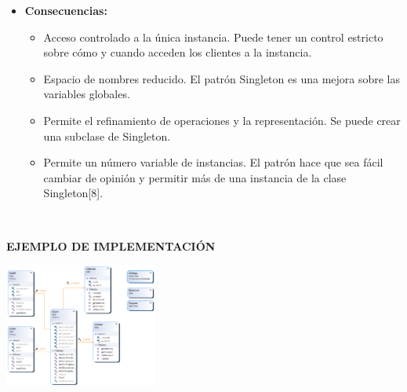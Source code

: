 \documentclass[twoside,twocolumn]{article}
\begin{document}
\begin{itemize}
		\item \textbf{Consecuencias:} 
        \begin{itemize}
            \item Acceso controlado a la única instancia. Puede tener un control estricto sobre cómo y cuando acceden los clientes a la instancia.   	
            \item Espacio de nombres reducido. El patrón Singleton es una mejora sobre las variables globales. 	   
            \item Permite el refinamiento de operaciones y la representación. Se puede crear una subclase de Singleton.   
            \item Permite un número variable de instancias. El patrón hace que sea fácil cambiar de opinión y permitir más de una instancia de la clase Singleton[8].  	
        \end{itemize}
	\end{itemize}
	
	
    \\
    \item \textbf{EJEMPLO DE IMPLEMENTACIÓN}
    \begin{center}
        \includegraphics[width=5cm]{./img/imagen4.png} 
    \end{center}
\end{document}
